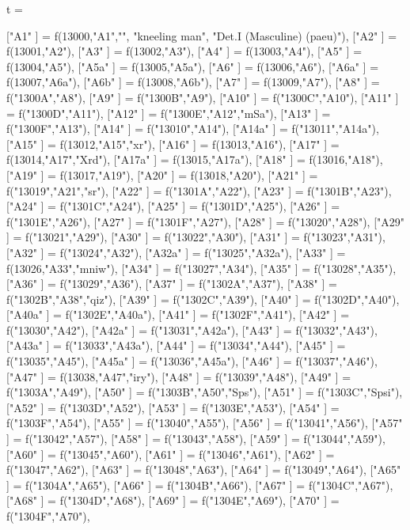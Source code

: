 \documentclass{article}
\begin{document}
\begin{luacode*}
t = {
   ["A1"    ]       =   f(13000,"A1","",
                         "kneeling man",
                          "Det.I (Masculine) (paeu)"),
   ["A2"    ] 		=  f(13001,"A2"),
   ["A3"    ] 		=  f(13002,"A3"),
   ["A4"    ] 		=  f(13003,"A4"),
   ["A5"    ]		=  f(13004,"A5"), 
   ["A5a"   ] 		=  f(13005,"A5a"),
   ["A6"    ]		=  f(13006,"A6"),
   ["A6a"   ]		=  f(13007,"A6a"),
   ["A6b"   ]		=  f(13008,"A6b"),
   ["A7"    ] 		=  f(13009,"A7"),
   ["A8"    ] 		=  f("1300A","A8"),
   ["A9"    ] 		=  f("1300B","A9"),
   ["A10"   ] 		=  f("1300C","A10"),
   ["A11"   ] 		=  f("1300D","A11"),
   ["A12"   ] 		=  f("1300E","A12","mSa"),
   ["A13"   ] 		=  f("1300F","A13"),
   ["A14"   ] 		=  f("13010","A14"),
   ["A14a"  ] 		=  f("13011","A14a"),
   ["A15"   ]		=  f(13012,"A15","xr"),
   ["A16"   ] 		=  f(13013,"A16"),
   ["A17"   ] 		=  f(13014,"A17","Xrd"),
   ["A17a"  ] 		=  f(13015,"A17a"),
   ["A18"   ] 		=  f(13016,"A18"),
   ["A19"   ] 		=  f(13017,"A19"),
   ["A20"   ] 		=  f(13018,"A20"),
   ["A21"   ] 		=  f("13019","A21","sr"),
   ["A22"   ] 		=  f("1301A","A22"),
   ["A23"   ] 		=  f("1301B","A23"),
   ["A24"   ] 		=  f("1301C","A24"),
   ["A25"   ] 		=  f("1301D","A25"),
   ["A26"   ] 		=  f("1301E","A26"),
   ["A27"   ] 		=  f("1301F","A27"),
   ["A28"   ] 		=  f("13020","A28"),
   ["A29"   ] 		=  f("13021","A29"),
   ["A30"   ] 		=  f("13022","A30"),
   ["A31"   ] 		=  f("13023","A31"),
   ["A32"   ] 		=  f("13024","A32"),
   ["A32a"  ] 		=  f("13025","A32a"),
   ["A33"   ] 		=  f(13026,"A33","mniw"),
   ["A34"   ] 		=  f("13027","A34"),
   ["A35"   ] 		=  f("13028","A35"),
   ["A36"   ] 		=  f("13029","A36"),
   ["A37"   ] 		=  f("1302A","A37"),
   ["A38"   ] 		=  f("1302B","A38","qiz"),
   ["A39"   ] 		=  f("1302C","A39"),
   ["A40"   ] 		=  f("1302D","A40"),
   ["A40a"  ] 		=  f("1302E","A40a"),
   ["A41"   ] 		=  f("1302F","A41"),
   ["A42"   ] 		=  f("13030","A42"),
   ["A42a"  ] 		=  f("13031","A42a"),
   ["A43"   ] 		=  f("13032","A43"),
   ["A43a"  ] 		=  f("13033","A43a"),
   ["A44"   ] 		=  f("13034","A44"),
   ["A45"   ] 		=  f("13035","A45"),
   ["A45a"  ] 		=  f("13036","A45a"),
   ["A46"   ] 		=  f("13037","A46"),
   ["A47"   ] 		=  f(13038,"A47","iry"),
   ["A48"   ] 		=  f("13039","A48"),
   ["A49"   ] 		=  f("1303A","A49"),
   ["A50"   ] 		=  f("1303B","A50","Sps"),
   ["A51"   ] 		=  f("1303C","Spsi"),
   ["A52"   ] 		=  f("1303D","A52"),
   ["A53"   ] 		=  f("1303E","A53"),
   ["A54"   ] 		=  f("1303F","A54"),
   ["A55"   ] 		=  f("13040","A55"),
   ["A56"   ] 		=  f("13041","A56"),
   ["A57"   ] 		=  f("13042","A57"),
   ["A58"   ] 		=  f("13043","A58"),
   ["A59"   ] 	    =  f("13044","A59"),
   ["A60"   ] 		=  f("13045","A60"),
   ["A61"   ] 		=  f("13046","A61"),
   ["A62"   ] 	    =  f("13047","A62"),
   ["A63"   ] 		=  f("13048","A63"),
   ["A64"   ] 		=  f("13049","A64"),
   ["A65"   ] 		=  f("1304A","A65"),
   ["A66"   ] 		=  f("1304B","A66"),
   ["A67"   ] 		=  f("1304C","A67"),
   ["A68"   ] 		=  f("1304D","A68"),
   ["A69"   ] 		=  f("1304E","A69"),
   ["A70"   ] 		=  f("1304F","A70"),

}
\end{luacode*}
\end{document}
